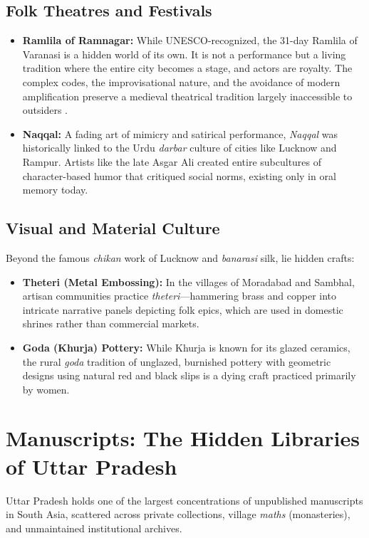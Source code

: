 \documentclass{article}
\begin{document}
\subsection{Folk Theatres and Festivals}
\begin{itemize}
    \item \textbf{Ramlila of Ramnagar:} While UNESCO-recognized, the 31-day Ramlila of Varanasi is a hidden world of its own. It is not a performance but a living tradition where the entire city becomes a stage, and actors are royalty. The complex codes, the improvisational nature, and the avoidance of modern amplification preserve a medieval theatrical tradition largely inaccessible to outsiders \cite{schechner1985between}.
    \item \textbf{Naqqal:} A fading art of mimicry and satirical performance, \textit{Naqqal} was historically linked to the Urdu \textit{darbar} culture of cities like Lucknow and Rampur. Artists like the late Asgar Ali created entire subcultures of character-based humor that critiqued social norms, existing only in oral memory today.
\end{itemize}

\subsection{Visual and Material Culture}
Beyond the famous \textit{chikan} work of Lucknow and \textit{banarasi} silk, lie hidden crafts:
\begin{itemize}
    \item \textbf{Theteri (Metal Embossing):} In the villages of Moradabad and Sambhal, artisan communities practice \textit{theteri}—hammering brass and copper into intricate narrative panels depicting folk epics, which are used in domestic shrines rather than commercial markets.
    \item \textbf{Goda (Khurja) Pottery:} While Khurja is known for its glazed ceramics, the rural \textit{goda} tradition of unglazed, burnished pottery with geometric designs using natural red and black slips is a dying craft practiced primarily by women.
\end{itemize}

\section{Manuscripts: The Hidden Libraries of Uttar Pradesh}
Uttar Pradesh holds one of the largest concentrations of unpublished manuscripts in South Asia, scattered across private collections, village \textit{maths} (monasteries), and unmaintained institutional archives.
\end{document}
